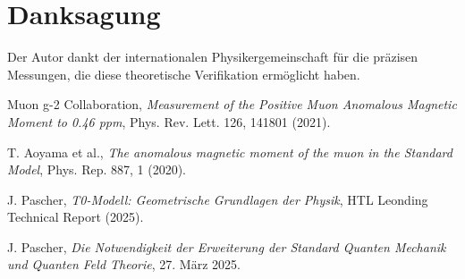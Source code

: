 \documentclass[12pt,a4paper]{article}
\begin{document}
	\section*{Danksagung}
	
	Der Autor dankt der internationalen Physikergemeinschaft für die präzisen Messungen, die diese theoretische Verifikation ermöglicht haben.
	
	\begin{thebibliography}{9}
		Muon g-2 Collaboration,
		\textit{Measurement of the Positive Muon Anomalous Magnetic Moment to 0.46 ppm},
		Phys. Rev. Lett. 126, 141801 (2021).
		
		T. Aoyama et al.,
		\textit{The anomalous magnetic moment of the muon in the Standard Model},
		Phys. Rep. 887, 1 (2020).
		
		J. Pascher,
		\textit{T0-Modell: Geometrische Grundlagen der Physik},
		HTL Leonding Technical Report (2025).
		
		J. Pascher,
		\textit{Die Notwendigkeit der Erweiterung der Standard Quanten Mechanik und Quanten Feld Theorie},
		27. März 2025.
		
	\end{thebibliography}
	
\end{document}
